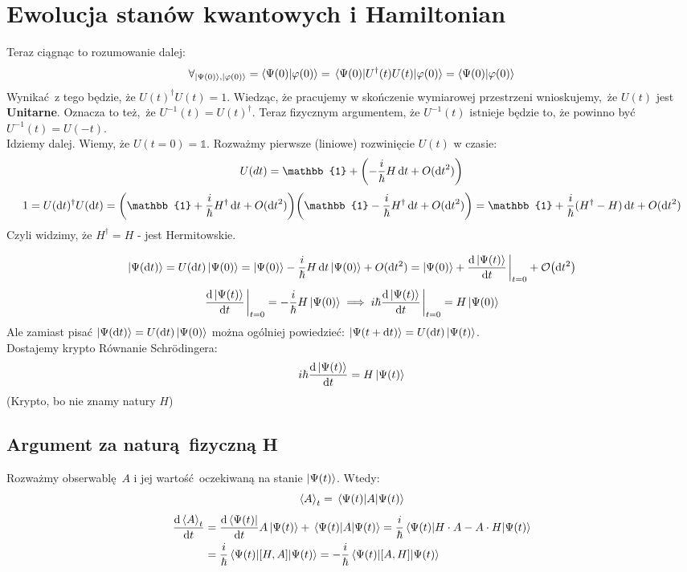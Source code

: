 \documentclass[12pt,a4paper]{report}
\newcommand{\subind}[2]{{\color{blue} #1\index{#2}}}
\newcommand{\psket}[1]{\ket{\Psi(#1)}}
\newcommand{\Id}{\mathbb{1}}
\renewcommand{\emph}{\textbf}
\newenvironment{lecture}[1]{\par\medskip
   \noindent\chapter{#1} \rmfamily}{\medskip}
\begin{document}
\begin{lecture}{Ewolucja stanów kwantowych i Hamiltonian}
Teraz ciągnąc to rozumowanie dalej:
\[
    \forall_{\ket{\Psi(0)}, \ket{\varphi(0)}} = \braket{\Psi(0)}{\varphi(0)} = \mel{\Psi(0)}{U^\dagger(t) U(t)}{\varphi(0)} = \braket{\Psi(0)}{\varphi(0)}
\]
Wynikać z tego będzie, że $U(t)^\dagger U(t) = 1$. Wiedząc, że pracujemy w skończenie wymiarowej przestrzeni wnioskujemy, że $U(t)$ jest \emph{Unitarne}. Oznacza to też, że $U^{-1}(t) = U(t)^\dagger$. Teraz fizycznym argumentem, że $U^{-1}(t)$ istnieje będzie to, że powinno być $U^{-1}(t) = U(-t)$.\\

Idziemy dalej. Wiemy, że $U(t=0) = \Id$. Rozważmy pierwsze (liniowe) rozwinięcie $U(t)$ w czasie:
\[
    U(dt) = \Id + \qty(- \frac{i}{\hbar} H \dd{t} + O(\dd{t}^2))
\]
\[
1 = U(\dd{t})^\dagger U(\dd{t}) = \qty(\Id + \frac{i}{\hbar} H^\dagger \dd{t} + O(\dd{t}^2)) \qty(\Id - \frac{i}{\hbar} H^\dagger \dd{t} + O(\dd{t}^2)) = \Id + \frac{i}{\hbar} (H^\dagger - H) \dd{t} + O(\dd{t}^2)
\]
Czyli widzimy, że $H^\dagger = H$ - jest Hermitowskie.

\[
    \psket{\dd{t}} = U(\dd{t}) \psket{0} = \psket{0} - \frac{i}{\hbar} H \dd{t} \psket{0} + O(\dd{t^2}) = \psket{0} + \dv{\psket{t}}{t}\eval_{t=0} + \order{\dd{t^2}}
\]
\[
    \dv{\psket{t}}{t}\eval_{t=0} = - \frac{i}{\hbar} H \psket{0} \implies i \hbar \dv{\psket{t}}{t}\eval_{t=0} = H \psket{0}
\]Ale zamiast pisać $\psket{\dd{t}} = U(\dd{t}) \psket{0}$ można ogólniej powiedzieć: $\psket{t + \dd{t}} = U(\dd{t}) \psket{t}$.\\
Dostajemy krypto \subind{Równanie Schrödingera}{Równanie!Schrödingera}:
\begin{equation}
    i \hbar \dv{\psket{t}}{t} = H \psket{t}
    \label{eq:lec_3:krypto_schrodinger}
\end{equation}
(Krypto, bo nie znamy natury $H$)

\section{Argument za naturą fizyczną H}
Rozważmy obserwablę $A$ i jej wartość oczekiwaną na stanie $\psket{t}$.
Wtedy:
\[
    \ev{A}_t = \ev{A}{\Psi(t)}
\]
\begin{align*}
    \dv{\ev{A}_t}{t} &= \dv{\bra{\Psi(t)}}{t} A \psket{t} + \ev{A}{\Psi(t)} = \frac{i}{\hbar} \ev{H\cdot A - A \cdot H}{\Psi(t)}\\
    &= \frac{i}{\hbar} \ev{\qty[H, A]}{\Psi(t)} = - \frac{i}{\hbar} \ev{\qty[A, H]}{\Psi(t)}
\end{align*}


\end{lecture}
\end{document}

